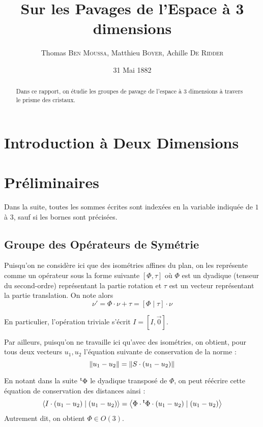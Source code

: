 \documentclass{cours}
\title{Sur les Pavages de l'Espace à 3 dimensions}
\author{Thomas \textsc{Ben Moussa}, Matthieu \textsc{Boyer}, Achille \textsc{De Ridder}}
\date{31 Mai 1882}
\begin{document}
\begin{abstract}
    Dans ce rapport, on étudie les groupes de pavage de l'espace à 3 dimensions à travers le prisme des cristaux.
\end{abstract}

\section{Introduction à Deux Dimensions}\label{section:2d}

\section{Préliminaires}\label{section:prelim}
Dans la suite, toutes les sommes écrites sont indexées en la variable indiquée de $1$ à $3$, sauf si les bornes sont précisées.
\subsection{Groupe des Opérateurs de Symétrie}\label{subsection:sym_op}
Puisqu'on ne considère ici que des isométries affines du plan, on les représente comme un opérateur sous la forme suivante $\left[\Phi, \tau\right]$ où $\Phi$ est un dyadique (tenseur du second-ordre) représentant la partie rotation et $\tau$ est un vecteur représentant la partie translation. On note alors
\begin{equation}\label{eq:op_def}
    \nu' = \Phi \cdot \nu + \tau = \left[\Phi\mid \tau\right] \cdot \nu
\end{equation}

En particulier, l'opération triviale s'écrit $I = \left[I, \vec{0}\right]$.

Par ailleurs, puisqu'on ne travaille ici qu'avec des isométries, on obtient, pour tous deux vecteurs $u_{1}, u_{2}$ l'équation suivante de conservation de la norme :
\begin{equation}\label{eq:iso_1}
    \left\lVert u_{1} - u_{2} \right\rVert = \left\lVert S \cdot \left(u_{1} - u_{2}\right) \right\rVert
\end{equation}

En notant dans la suite ${^{\mathsf{t}}}\Phi$ le dyadique transposé de $\Phi$, on peut réécrire cette équation de conservation des distances ainsi :
\begin{equation}\label{eq:iso_2}
    \left\langle I\cdot \left(u_{1} - u_{2}\right)\mid \left(u_{1} - u_{2}\right) \right\rangle = \left\langle \Phi \cdot {^{\mathsf{t}}}\Phi \cdot \left(u_{1} - u_{2}\right)\mid \left(u_{1} - u_{2}\right) \right\rangle
\end{equation}
Autrement dit, on obtient $\Phi \in O(3)$.
\end{document}
